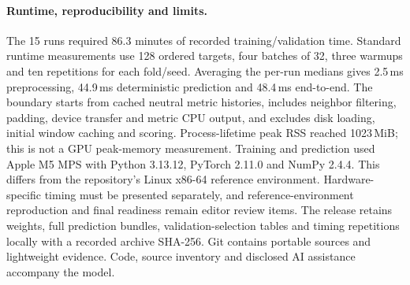 \paragraph{Runtime, reproducibility and limits.}
The 15 runs required 86.3 minutes of recorded training/validation time. Standard runtime measurements use 128 ordered targets, four batches of 32, three warmups and ten repetitions for each fold/seed. Averaging the per-run medians gives 2.5\,ms preprocessing, 44.9\,ms deterministic prediction and 48.4\,ms end-to-end. The boundary starts from cached neutral metric histories, includes neighbor filtering, padding, device transfer and metric CPU output, and excludes disk loading, initial window caching and scoring. Process-lifetime peak RSS reached 1023\,MiB; this is not a GPU peak-memory measurement.
Training and prediction used Apple M5 MPS with Python 3.13.12, PyTorch 2.11.0 and NumPy 2.4.4. This differs from the repository's Linux x86-64 reference environment. Hardware-specific timing must be presented separately, and reference-environment reproduction and final readiness remain editor review items. The release retains weights, full prediction bundles, validation-selection tables and timing repetitions locally with a recorded archive SHA-256. Git contains portable sources and lightweight evidence. Code, source inventory and disclosed AI assistance accompany the model.
